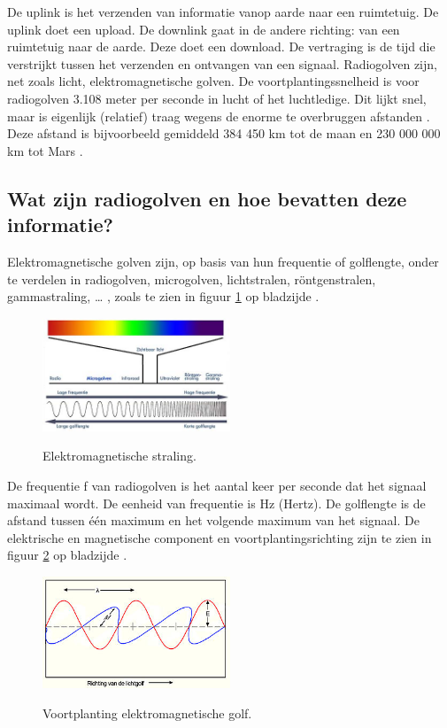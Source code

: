 De uplink is het verzenden van informatie vanop aarde naar een ruimtetuig. De uplink doet een upload. De downlink gaat in de andere richting: van een ruimtetuig naar de aarde. Deze doet een download. De vertraging is de tijd die verstrijkt tussen het verzenden en ontvangen van een signaal. Radiogolven zijn, net zoals licht, elektromagnetische golven. De voortplantingssnelheid is voor radiogolven 3.108 meter per seconde in lucht of het luchtledige. Dit lijkt snel, maar is eigenlijk (relatief) traag wegens de enorme te overbruggen afstanden \cite{updown}. Deze afstand is bijvoorbeeld gemiddeld 384 450 km tot de maan \cite{maan} en 230 000 000 km tot Mars \cite{mars}.

\subsection{Wat zijn radiogolven en hoe bevatten deze informatie?}

Elektromagnetische golven zijn, op basis van hun frequentie of golflengte, onder te verdelen in radiogolven, microgolven, lichtstralen, röntgenstralen, gammastraling, … \cite{radiowaves}, zoals te zien in figuur \ref{fig:EMS} op bladzijde \pageref{fig:EMS}.

\begin{figure}[ht]
  \centering
  \includegraphics[width=0.5\textwidth]{voorbeeld_figuren/spectrum_straling}
  \caption{Elektromagnetische straling.} 
  \cite{energiezonnepanelen} %
  \label{fig:EMS}
\end{figure}

De frequentie f van radiogolven is het aantal keer per seconde dat het signaal maximaal wordt. De eenheid van frequentie is Hz (Hertz). De golflengte is de afstand tussen één maximum en het volgende maximum van het signaal. De elektrische en magnetische component en voortplantingsrichting zijn te zien in figuur \ref{fig:golf} op bladzijde \pageref{fig:golf}.

\begin{figure}[ht]
  \centering
  \includegraphics[width=0.5\textwidth]{voorbeeld_figuren/elektromagnetische_golf}
  \caption{Voortplanting elektromagnetische golf.} 
  \cite{elektromagnetischestraling}
  \label{fig:golf}
\end{figure}

